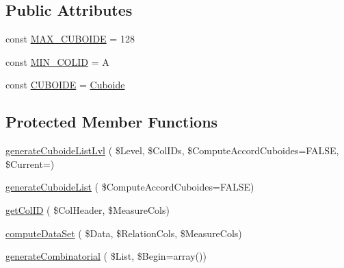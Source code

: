 \subsection*{Public Attributes}
\begin{DoxyCompactItemize}
\item 
const \hyperlink{class_sky_cube_a7379f6cb471bafe6208e7c82bd19eafb}{M\+A\+X\+\_\+\+C\+U\+B\+O\+I\+DE} = 128
\item 
const \hyperlink{class_sky_cube_a02a81cad7f2521e515a4f7574d2899ae}{M\+I\+N\+\_\+\+C\+O\+L\+ID} = \textquotesingle{}A\textquotesingle{}
\item 
const \hyperlink{class_sky_cube_a30dbde9937a3942ea12ad1cd2b9740a0}{C\+U\+B\+O\+I\+DE} = \textquotesingle{}\hyperlink{class_cuboide}{Cuboide}\textquotesingle{}
\end{DoxyCompactItemize}
\subsection*{Protected Member Functions}
\begin{DoxyCompactItemize}
\item 
\hyperlink{class_sky_cube_a19cef89f0ed6c66283b68fb9b4dcafa6}{generate\+Cuboide\+List\+Lvl} ( \$Level, \$Col\+I\+Ds, \$Compute\+Accord\+Cuboides=F\+A\+L\+SE, \$Current=\textquotesingle{}\textquotesingle{})
\item 
\hyperlink{class_sky_cube_a66b8cb4ff0f25754d2384224c7e40ced}{generate\+Cuboide\+List} ( \$Compute\+Accord\+Cuboides=F\+A\+L\+SE)
\item 
\hyperlink{class_sky_cube_a055600504acd68aa4dfbb7f7d9425066}{get\+Col\+ID} ( \$Col\+Header, \$Measure\+Cols)
\item 
\hyperlink{class_sky_cube_aeccacbd6761b125ed1976e29d061bf41}{compute\+Data\+Set} ( \$Data, \$Relation\+Cols, \$Measure\+Cols)
\item 
\hyperlink{class_sky_cube_a7b3e29b56258fde62d37e1a405c819d5}{generate\+Combinatorial} ( \$List, \$Begin=array())
\end{DoxyCompactItemize}
